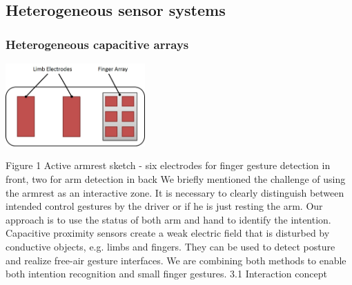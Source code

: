 \subsection{Heterogeneous sensor systems}
\subsubsection{Heterogeneous capacitive arrays}

\begin{minipage}{\linewidth}
\centering
\includegraphics[width=0.4\textwidth]{images/proc_hetero_array}
\label{fig:proc_hetero_array}
\end{minipage}

Figure 1 Active armrest sketch - six electrodes for finger gesture detection in front, two for arm detection in back
We briefly mentioned the challenge of using the armrest as an interactive zone. It is necessary to clearly distinguish between intended control gestures by the driver or if he is just resting the arm. Our approach is to use the status of both arm and hand to identify the intention. Capacitive proximity sensors create a weak electric field that is disturbed by conductive objects, e.g. limbs and fingers. They can be used to detect posture and realize free-air gesture interfaces. We are combining both methods to enable both intention recognition and small finger gestures.
3.1	Interaction concept

